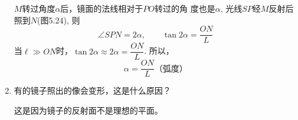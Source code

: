 \begin{enumerate}
    \begin{solution}
        $M$转过角度$\alpha$后，镜面的法线相对于$PO$转过的角
        度也是$\alpha$, 光线$SP$经$M$反射后照到$N$(图5.24), 则
\[\angle SPN=2\alpha,\qquad \tan2\alpha=\frac{ON}{L}\] 
当$\ell\gg ON$时，$\tan 2\alpha\approx 2\alpha=\dfrac{ON}{L}$. 所以，
\[\alpha=\dfrac{ON}{L}\text{（弧度）}\]
    \end{solution}

    \item 有的镜子照出的像会变形，这是什么原因？
    
    \begin{solution}
        这是因为镜子的反射面不是理想的平面。
    \end{solution}
\end{enumerate}






